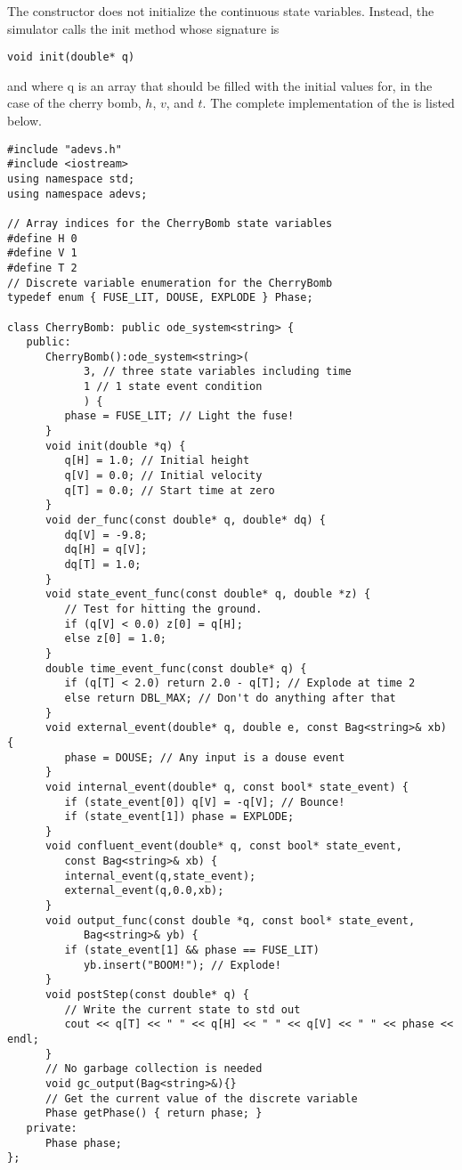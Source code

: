 The constructor does not initialize the continuous state variables. Instead, the simulator calls the init method whose signature is
\begin{verbatim}
void init(double* q)
\end{verbatim}
and where q is an array that should be filled with the initial values for, in the case of the cherry bomb, $h$, $v$, and $t$. The complete implementation of the  is listed below.
\begin{verbatim}
#include "adevs.h"
#include <iostream>
using namespace std;
using namespace adevs;

// Array indices for the CherryBomb state variables
#define H 0
#define V 1
#define T 2
// Discrete variable enumeration for the CherryBomb
typedef enum { FUSE_LIT, DOUSE, EXPLODE } Phase;

class CherryBomb: public ode_system<string> {
   public:
      CherryBomb():ode_system<string>(
            3, // three state variables including time
            1 // 1 state event condition
            ) {
         phase = FUSE_LIT; // Light the fuse!
      }
      void init(double *q) {
         q[H] = 1.0; // Initial height
         q[V] = 0.0; // Initial velocity
         q[T] = 0.0; // Start time at zero
      }
      void der_func(const double* q, double* dq) {
         dq[V] = -9.8; 
         dq[H] = q[V]; 
         dq[T] = 1.0; 
      }
      void state_event_func(const double* q, double *z) {
         // Test for hitting the ground. 
         if (q[V] < 0.0) z[0] = q[H];
         else z[0] = 1.0;
      }
      double time_event_func(const double* q) {
         if (q[T] < 2.0) return 2.0 - q[T]; // Explode at time 2
         else return DBL_MAX; // Don't do anything after that
      }
      void external_event(double* q, double e, const Bag<string>& xb) {
         phase = DOUSE; // Any input is a douse event
      }
      void internal_event(double* q, const bool* state_event) {
         if (state_event[0]) q[V] = -q[V]; // Bounce!
         if (state_event[1]) phase = EXPLODE;
      }
      void confluent_event(double* q, const bool* state_event,
         const Bag<string>& xb) {
         internal_event(q,state_event);
         external_event(q,0.0,xb);
      }
      void output_func(const double *q, const bool* state_event,
            Bag<string>& yb) {
         if (state_event[1] && phase == FUSE_LIT)
            yb.insert("BOOM!"); // Explode!
      }
      void postStep(const double* q) {
         // Write the current state to std out
         cout << q[T] << " " << q[H] << " " << q[V] << " " << phase << endl;
      }
      // No garbage collection is needed
      void gc_output(Bag<string>&){}
      // Get the current value of the discrete variable
      Phase getPhase() { return phase; } 
   private:
      Phase phase;
};
\end{verbatim}

